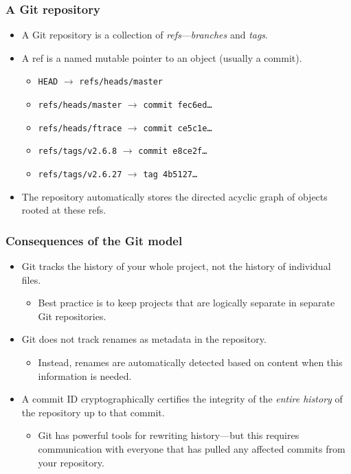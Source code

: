 \documentclass{beamer}
\begin{document}
\begin{frame}
  \frametitle{A Git repository}
  \begin{itemize}
  \item A Git repository is a collection of
    \emph{refs}---\emph{branches} and \emph{tags}.
  \item A ref is a named mutable pointer to an object (usually a
    commit).
    \begin{itemize}
    \item \texttt{HEAD} $\to$ \texttt{refs/heads/master}
    \item \texttt{refs/heads/master} $\to$ \texttt{commit fec6ed\ldots}
    \item \texttt{refs/heads/ftrace} $\to$ \texttt{commit ce5c1e\ldots}
    \item \texttt{refs/tags/v2.6.8} $\to$ \texttt{commit e8ce2f\ldots}
    \item \texttt{refs/tags/v2.6.27} $\to$ \texttt{tag 4b5127\ldots}
    \end{itemize}
  \item The repository automatically stores the directed acyclic graph
    of objects rooted at these refs.
  \end{itemize}
\end{frame}

\begin{frame}
  \frametitle{Consequences of the Git model}

  \begin{itemize}
  \item Git tracks the history of your whole project, not the history
    of individual files.
    \begin{itemize}
    \item Best practice is to keep projects that are logically
      separate in separate Git repositories.
    \end{itemize}
  \item Git does not track renames as metadata in the repository.
    \begin{itemize}
    \item Instead, renames are automatically detected based on content
      when this information is needed.
    \end{itemize}
  \item A commit ID cryptographically certifies the integrity of the
    \emph{entire history} of the repository up to that commit.
    \begin{itemize}
    \item Git has powerful tools for rewriting history---but this
      requires communication with everyone that has pulled any
      affected commits from your repository.
    \end{itemize}
  \end{itemize}
\end{frame}
\end{document}
